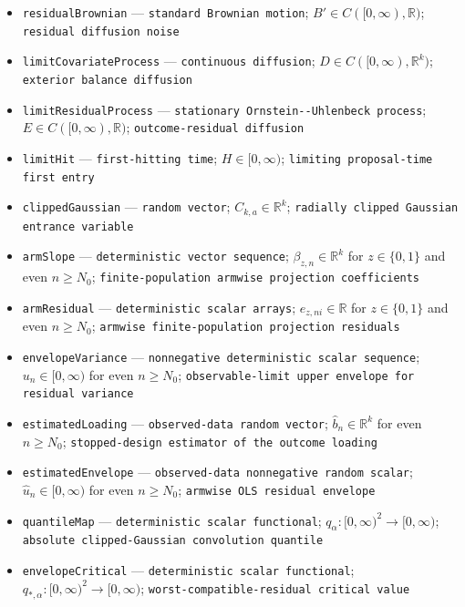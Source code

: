 \documentclass{article}
\begin{document}
\begin{itemize}
  \item \texttt{residualBrownian} --- \texttt{standard Brownian motion}; \(B'\in C([0,\infty),\mathbb R)\); \texttt{residual diffusion noise}
  \item \texttt{limitCovariateProcess} --- \texttt{continuous diffusion}; \(D\in C([0,\infty),\mathbb R^k)\); \texttt{exterior balance diffusion}
  \item \texttt{limitResidualProcess} --- \texttt{stationary Ornstein-\allowbreak{}-\allowbreak{}Uhlenbeck process}; \(E\in C([0,\infty),\mathbb R)\); \texttt{outcome-\allowbreak{}residual diffusion}
  \item \texttt{limitHit} --- \texttt{first-\allowbreak{}hitting time}; \(H\in[0,\infty)\); \texttt{limiting proposal-\allowbreak{}time first entry}
  \item \texttt{clippedGaussian} --- \texttt{random vector}; \(C_{k,a}\in\mathbb R^k\); \texttt{radially clipped Gaussian entrance variable}
  \item \texttt{armSlope} --- \texttt{deterministic vector sequence}; \(\beta_{z,n}\in\mathbb R^k\) for \(z\in\{0,1\}\) and even \(n\ge N_0\); \texttt{finite-\allowbreak{}population armwise projection coefficients}
  \item \texttt{armResidual} --- \texttt{deterministic scalar arrays}; \(e_{z,ni}\in\mathbb R\) for \(z\in\{0,1\}\) and even \(n\ge N_0\); \texttt{armwise finite-\allowbreak{}population projection residuals}
  \item \texttt{envelopeVariance} --- \texttt{nonnegative deterministic scalar sequence}; \(u_n\in[0,\infty)\) for even \(n\ge N_0\); \texttt{observable-\allowbreak{}limit upper envelope for residual variance}
  \item \texttt{estimatedLoading} --- \texttt{observed-\allowbreak{}data random vector}; \(\widehat b_n\in\mathbb R^k\) for even \(n\ge N_0\); \texttt{stopped-\allowbreak{}design estimator of the outcome loading}
  \item \texttt{estimatedEnvelope} --- \texttt{observed-\allowbreak{}data nonnegative random scalar}; \(\widehat u_n\in[0,\infty)\) for even \(n\ge N_0\); \texttt{armwise OLS residual envelope}
  \item \texttt{quantileMap} --- \texttt{deterministic scalar functional}; \(q_{\alpha}:[0,\infty)^2\to[0,\infty)\); \texttt{absolute clipped-\allowbreak{}Gaussian convolution quantile}
  \item \texttt{envelopeCritical} --- \texttt{deterministic scalar functional}; \(q_{*,\alpha}:[0,\infty)^2\to[0,\infty)\); \texttt{worst-\allowbreak{}compatible-\allowbreak{}residual critical value}

\end{itemize}
\end{document}

